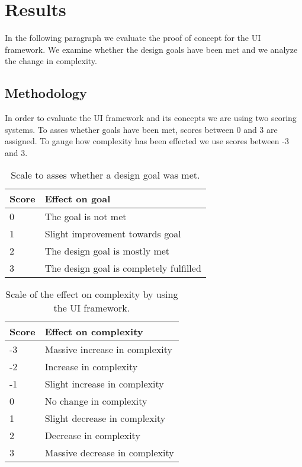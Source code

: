 \section{Results}\label{sec:results}
In the following paragraph we evaluate the proof of concept for the UI framework. We examine whether the design goals have been met and we analyze the change in complexity.

\subsection{Methodology}
In order to evaluate the UI framework and its concepts we are using two scoring systems. To asses whether goals have been met, scores between 0 and 3 are assigned. To gauge how complexity has been effected we use scores between -3 and 3.

\begin{table}[!htb]
  \begin{center}
    \begin{tabular}{|l|l|}
      \hline
      \textbf{Score} & \textbf{Effect on goal} \\
      \hline
      0 & The goal is not met \\
      \hline
      1 & Slight improvement towards goal \\
      \hline
      2 & The design goal is mostly met \\
      \hline
      3 & The design goal is completely fulfilled \\
      \hline
    \end{tabular}
    \caption{Scale to asses whether a design goal was met.}
  \end{center}
\end{table}

\begin{table}[!htb]
  \begin{center}
    \begin{tabular}{|l|l|}
      \hline
      \textbf{Score} & \textbf{Effect on complexity} \\
      \hline
      -3 & Massive increase in complexity \\
      \hline
      -2 & Increase in complexity \\
      \hline
      -1 & Slight increase in complexity \\
      \hline
      0 & No change in complexity \\
      \hline
      1 & Slight decrease in complexity \\
      \hline
      2 & Decrease in complexity \\
      \hline
      3 & Massive decrease in complexity \\
      \hline
    \end{tabular}
    \caption{Scale of the effect on complexity by using the UI framework.}
  \end{center}
\end{table}

